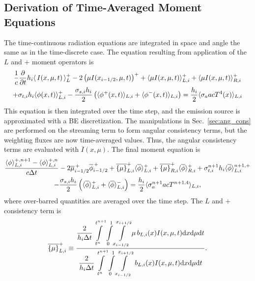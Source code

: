 \subsection{Derivation of Time-Averaged Moment Equations}

The time-continuous radiation equations are integrated in space and angle the same as in
the time-discrete case.  The equation resulting from application of the $L$ and $+$ moment
operators is
\begin{multline}
    \frac{1}{c}   \frac{\partial  }{\partial t} h_i \langle \,I(x,\mu,t)\, \rangle^+_L - 2\left({\mu}
    I(x_{i-1/2},\mu,t)\right)^+ + \langle \mu I(x,\mu,t) \rangle^+_{L,i} 
    + \langle \mu I(x,\mu,t) \rangle^+_{R,i} \\ +  \sigma_{t,i} h_i \langle \phi(x,t) \rangle_{L,i}^{+} -
    \frac{\sigma_{s,i} h_i}{2} \left( \langle \phi^+(x,t) \rangle_{L,i} +
    \langle \phi^-(x,t) \rangle_{L,i}\right) = \frac{h_i}{2} \langle \sigma_a a c T^4(x) \rangle_{L,i} 
\end{multline}
This equation is then integrated over the time step, and the emission source is
approximated with a BE discretization.  The manipulations in Sec.~\ref{sec:ang_cons} are
performed on the streaming term to form angular consistency terms, but the weighting fluxes are now
time-averaged values.  Thus, the angular consistency terms are evaluated with $\overline
I(x,\mu)$.
The final moment equation is 
\begin{multline}\label{eq:t_moml_ex}
    \frac{\langle \phi \rangle_{L,i}^{+,n+1} - \langle \phi \rangle_{L,i}^{+,n}}{c \Delta t}
    -2\overline {\mu}_{i-1/2}^{\,+} \overline \phi_{i-1/2}^{\,+} + \overline{\left\{ \mu \right\}}_{L,i}^{+}
  \langle \overline{\phi} \rangle_{L,i}^{+}
  +  \overline{\left\{ \mu \right\}}_{R,i}^{+}
  \langle \overline{\phi} \rangle_{R,i}^{+} +  \sigma_{t,i}^{n+1} h_i 
  \langle \overline\phi \rangle_{L,i}^{n+1,+} \\-  \frac{\sigma_{s,i} h_i}{2} \left( \langle \overline{\phi} \rangle_{L,i}^{+} +
  \langle \overline{\phi} \rangle_{L,i}^{-}\right) = \frac{h_i}{2} \langle \sigma_a^{n+1} a c T^{n+1,4} \rangle_{L,i},
\end{multline}
where over-barred quantities are averaged over the time step. The $L$ and
$+$ consistency term is
\begin{equation}
    \overline{\left\{ {\mu} \right\}}_{L,i}^{+} \equiv  \frac{\displaystyle 
        {\displaystyle \frac{2}{h_i\Delta t}} \int\limits_{t^n}^{t^{n+1}} \int\limits_0^1 \int\limits_{{x_{i-1/2}}}^{{x_{i+1/2}}} \mu \, b_{L,i}(x)
I(x,\mu,t) \mathrm{d} x \mathrm{d} \mu \mathrm{d} t } 
{\displaystyle {\displaystyle \frac{2}{h_i \Delta t}}\int\limits_{t^n}^{t^{n+1}} \int\limits_0^1 \int\limits_{{x_{i-1/2}}}^{{x_{i+1/2}}} \, b_{L,i}(x)
I(x,\mu,t) \mathrm{d} x \mathrm{d} \mu \mathrm{d} t } .
\end{equation}

